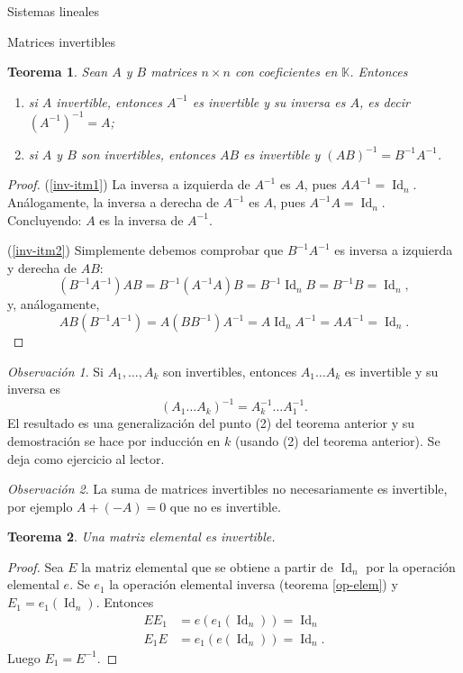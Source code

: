 \documentclass[a4paper,12pt,twoside,spanish,reqno]{amsbook}
\newtheorem{teorema}{Teorema}[section]
\theoremstyle{definition}
\theoremstyle{remark}
\newtheorem{observacion}{Observaci\'on}[section]
\newcommand{\Id}{\operatorname{Id}}
\newcommand{\K}{\mathbb K}
\begin{document}
\begin{chapter}{Sistemas lineales}
\begin{section}{Matrices invertibles}
			
			
			\begin{teorema}\label{th-prod-inv-impl-inv}
				Sean $A$ y $B$ matrices $n \times n$ con coeficientes en $\K$. Entonces
				\begin{enumerate}
					\item \label{inv-itm1} si $A$ invertible,  entonces $A^{-1}$  es invertible y su inversa es $A$,  es decir $(A^{-1})^{-1}=A$;
					\item \label{inv-itm2} si $A$ y $B$ son invertibles, entonces $AB$ es invertible y $(AB)^{-1} = B^{-1}A^{-1}$.
				\end{enumerate}
			\end{teorema}
				\begin{proof}
					(\ref{inv-itm1}) La inversa a izquierda de $A^{-1}$ es $A$, pues $AA^{-1}=\Id_n$. Análogamente, la inversa a derecha de $A^{-1}$ es $A$, pues $A^{-1}A = \Id_n$. Concluyendo: $A$  es la inversa de $A^{-1}$.
					
					(\ref{inv-itm2}) Simplemente debemos comprobar que $B^{-1}A^{-1}$ es inversa a izquierda y derecha de $AB$:
					\begin{equation*}
					(B^{-1}A^{-1})AB = B^{-1}(A^{-1}A)B = B^{-1}\Id_nB =B^{-1}B = \Id_n,
					\end{equation*}
					y,  análogamente,
					\begin{equation*}
					AB(B^{-1}A^{-1}) = A(BB^{-1})A^{-1} = A\Id_nA^{-1} =AA^{-1} = \Id_n.
					\end{equation*} 
				\end{proof}
			
			
			\begin{observacion}
				Si $A_1,\ldots,A_k$  son invertibles,  entonces $A_1\ldots A_k$ es invertible y su inversa es  $$(A_1\ldots A_k)^{-1} = A_k^{-1}\ldots A_1^{-1} .$$
				El resultado es una generalización del punto (2) del teorema anterior y su demostración se hace por inducción en $k$ (usando (2)  del teorema anterior). Se deja como ejercicio al lector. 
			\end{observacion}
			
			\begin{observacion}
				La suma de matrices invertibles no necesariamente es invertible, por ejemplo $A+ (-A)= 0$ que no es invertible. 
			\end{observacion}	
			
			
			\begin{teorema}\label{th-elmental-impl-invertible}
				Una matriz elemental es invertible.
			\end{teorema}
			\begin{proof}
				Sea $E$ la matriz elemental que se obtiene a partir de $\Id_n$ por la operación elemental $e$. Se $e_1$ la operación elemental inversa (teorema \ref{op-elem}) y $E_1 = e_1(\Id_n)$. Entonces 
				\begin{align*}
				EE_1 &= e(e_1(\Id_n)) = \Id_n \\
				E_1E &= e_1(e(\Id_n)) = \Id_n.
				\end{align*}
				Luego  $E_1 = E^{-1}$. 
			\end{proof}	
			

\end{section}
\end{chapter}
\end{document}
